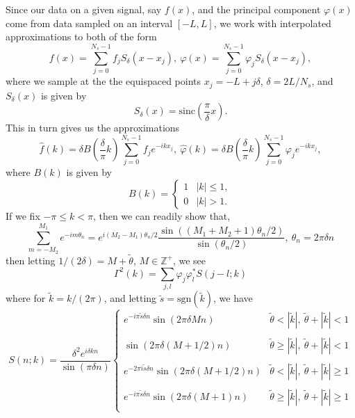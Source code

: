 \documentclass[a4paper,11pt]{article}
\newcommand{\ba}{\begin{array}}
\newcommand{\ea}{\end{array}}
\begin{document}
Since our data on a given signal, say $f(x)$, and the principal component $\varphi(x)$ come from data sampled on an interval $[-L,L]$, we work with interpolated approximations to both of the form
\[
f(x) = \sum_{j=0}^{N_{s}-1}f_{j}S_{\delta}(x-x_{j}), ~ \varphi(x) = \sum_{j=0}^{N_{s}-1} \varphi_{j}S_{\delta}(x-x_{j}), 
\]
where we sample at the the equispaced points $x_{j} = -L+j\delta $, $\delta = 2L/N_{s}$, and $S_{\delta }(x)$ is given by 
\[
S_{\delta}(x) = \mbox{sinc}\left(\frac{\pi}{\delta} x\right).
\]
This in turn gives us the approximations 
\[
\hat{f}(k) = \delta B\left(\frac{\delta}{\pi} k\right)\sum_{j=0}^{N_{s}-1}f_{j}e^{-ikx_{j}}, ~ \hat{\varphi}(k) = \delta B\left(\frac{\delta}{\pi} k\right)\sum_{j=0}^{N_{s}-1}\varphi_{j}e^{-ikx_{j}},
\]
where $B(k)$ is given by 
\[
B(k) = \left\{
\ba{rl}
1 & |k| \leq 1, \\ 
0 & |k| > 1.
\ea
\right.
\]
If we fix $-\pi \leq k < \pi$, then we can readily show that,
\[
\sum_{m=-M_{2}}^{M_{1}}e^{-im\theta_{n}} = e^{i(M_{2}-M_{1})\theta_{n}/2}\frac{\sin\left((M_{1}+M_{2}+1)\theta_{n}/2\right)}{\sin\left(\theta_{n}/2\right)}, ~ \theta_{n} = 2\pi \delta n
\]
then letting $1/(2\delta) = M + \tilde{\theta}$, $M\in\mathbb{Z}^{+}$, we see 
\[
\Gamma^{2}(k) = \sum_{j,l}\varphi_{j}\varphi^{\ast}_{l}S(j-l;k)
\]
where for $\tilde{k}=k/(2\pi)$, and letting $\tilde{s}=\mbox{sgn}(\tilde{k})$, we have 
\[
S(n;k) = \frac{\delta^{2} e^{i \delta k n}}{\sin\left(\pi \delta n\right)}\left\{\begin{array}{rl} e^{-i \pi \tilde{s}\delta n}\sin\left(2\pi \delta Mn\right) & \tilde{\theta} < \left|\tilde{k}\right|, ~  \tilde{\theta} + \left|\tilde{k}\right| < 1\\ 
&\\
\sin\left(2\pi \delta (M+1/2)n\right) & \tilde{\theta} \geq \left|\tilde{k}\right|, ~  \tilde{\theta} + \left|\tilde{k}\right| < 1 \\
& \\
e^{-2\pi i \tilde{s}\delta n} \sin\left(2\pi \delta (M+1/2) n\right) & \tilde{\theta} < \left|\tilde{k}\right|, ~  \tilde{\theta} + \left|\tilde{k}\right| \geq 1 \\
& \\ 
e^{-i\pi \tilde{s}\delta n} \sin\left(2\pi \delta (M+1) n\right) & \tilde{\theta} \geq \left|\tilde{k}\right|, ~  \tilde{\theta} + \left|\tilde{k}\right| \geq 1 \\
\end{array}\right.
\]
\end{document}
